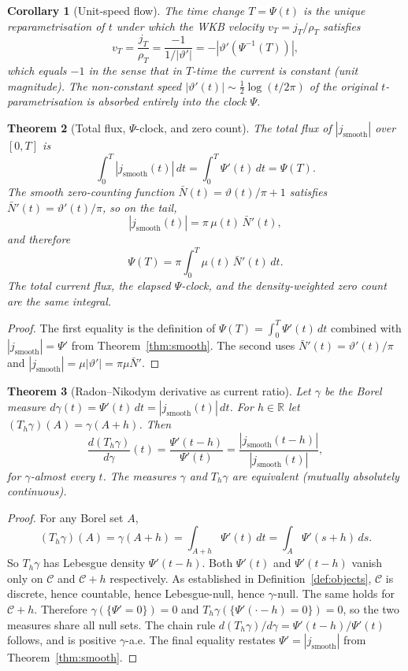 \documentclass[11pt]{article}
\theoremstyle{plain}
\newtheorem{theorem}{Theorem}
\newtheorem{corollary}[theorem]{Corollary}
\theoremstyle{definition}
\theoremstyle{remark}
\begin{document}
\begin{corollary}[Unit-speed flow]
The time change $T = \Psi(t)$ is the unique reparametrisation of $t$
under which the WKB velocity $v_T = j_T/\rho_T$ satisfies
\[
v_T = \frac{j_T}{\rho_T}
= \frac{-1}{1/|\vartheta'|} = -|\vartheta'(\Psi^{-1}(T))|,
\]
which equals $-1$ in the sense that in $T$-time the current is
constant (unit magnitude). The non-constant speed $|\vartheta'(t)|
\sim \tfrac{1}{2}\log(t/2\pi)$ of the original $t$-parametrisation
is absorbed entirely into the clock $\Psi$.
\end{corollary}

\begin{theorem}[Total flux, $\Psi$-clock, and zero count]
\label{thm:flux}
The total flux of $|j_{\mathrm{smooth}}|$ over $[0,T]$ is
\[
\int_0^T |j_{\mathrm{smooth}}(t)|\,dt
= \int_0^T \Psi'(t)\,dt = \Psi(T).
\]
The smooth zero-counting function $\bar N(t) = \vartheta(t)/\pi + 1$
satisfies $\bar N'(t) = \vartheta'(t)/\pi$, so on the tail,
\[
|j_{\mathrm{smooth}}(t)| = \pi\,\mu(t)\,\bar N'(t),
\]
and therefore
\[
\Psi(T) = \pi\int_0^T \mu(t)\,\bar N'(t)\,dt.
\]
The total current flux, the elapsed $\Psi$-clock, and the
density-weighted zero count are the same integral.
\end{theorem}

\begin{proof}
The first equality is the definition of $\Psi(T) =
\int_0^T\Psi'(t)\,dt$ combined with $|j_{\mathrm{smooth}}| = \Psi'$
from Theorem~\ref{thm:smooth}. The second uses $\bar N'(t) =
\vartheta'(t)/\pi$ and $|j_{\mathrm{smooth}}| = \mu|\vartheta'| =
\pi\mu\bar N'$.
\end{proof}

\begin{theorem}[Radon--Nikodym derivative as current ratio]
\label{thm:RN}
Let $\gamma$ be the Borel measure $d\gamma(t) = \Psi'(t)\,dt =
|j_{\mathrm{smooth}}(t)|\,dt$. For $h\in\mathbb{R}$ let
$(T_h\gamma)(A) = \gamma(A+h)$. Then
\[
\frac{d(T_h\gamma)}{d\gamma}(t)
= \frac{\Psi'(t-h)}{\Psi'(t)}
= \frac{|j_{\mathrm{smooth}}(t-h)|}{|j_{\mathrm{smooth}}(t)|},
\]
for $\gamma$-almost every $t$. The measures $\gamma$ and $T_h\gamma$
are equivalent (mutually absolutely continuous).
\end{theorem}

\begin{proof}
For any Borel set $A$,
\[
(T_h\gamma)(A) = \gamma(A+h) = \int_{A+h}\Psi'(t)\,dt
= \int_A \Psi'(s+h)\,ds.
\]
So $T_h\gamma$ has Lebesgue density $\Psi'(t-h)$. Both $\Psi'(t)$
and $\Psi'(t-h)$ vanish only on $\mathcal{C}$ and $\mathcal{C}+h$
respectively. As established in Definition~\ref{def:objects},
$\mathcal{C}$ is discrete, hence countable, hence Lebesgue-null,
hence $\gamma$-null. The same holds for $\mathcal{C}+h$. Therefore
$\gamma(\{\Psi'=0\}) = 0$ and $T_h\gamma(\{\Psi'(\cdot-h)=0\}) = 0$,
so the two measures share all null sets. The chain rule
$d(T_h\gamma)/d\gamma = \Psi'(t-h)/\Psi'(t)$ follows, and is
positive $\gamma$-a.e. The final equality restates $\Psi' =
|j_{\mathrm{smooth}}|$ from Theorem~\ref{thm:smooth}.
\end{proof}
\end{document}
